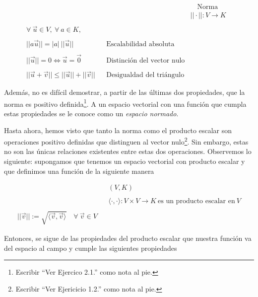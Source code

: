 \documentclass[12pt,dvipsnames]{article}
\numberwithin{equation}{section}
\begin{document}
\begin{align*}
     & & &\quad \text{Norma}& \\
     & & &||\cdot||:V\to K& \\
     \\
     \forall \ \vec{u}\in V, \ \forall \ a\in K, \\
     \\
     ||a\vec{u}|| = |a| \ ||\vec{u}|| & &\text{Escalabilidad absoluta}\\
     \\
     ||\vec{u}|| = 0 \iff \vec{u} = \vec{0} & &\text{Distinción del vector nulo}\\
     \\
     ||\vec{u}+\vec{v}|| \le ||\vec{u}|| + ||\vec{v}|| & &\text{Desigualdad del triángulo}
\end{align*}

Además, no es difícil demostrar, a partir de las últimas dos propiedades, que la norma es positivo definida\footnote{Escribir ``Ver Ejercico 2.1.'' como nota al pie.}. A un espacio vectorial con una función que cumpla estas propiedades se le conoce como un \emph{espacio normado}.

Hasta ahora, hemos visto que tanto la norma como el producto escalar son operaciones positivo definidas que distinguen al vector nulo\footnote{Escribir ``Ver Ejericicio 1.2.'' como nota al pie.}. Sin embargo, estas no son las únicas relaciones existentes entre estas dos operaciones. Observemos lo siguiente: supongamos que tenemos un espacio vectorial con producto escalar y que definimos una función de la siguiente manera

\begin{align*}
    & &(V,K) \\
    \\
    & &\langle \cdot , \cdot \rangle : V\times V\to K \ \text{es un producto escalar en} \ V\\
    \\
    ||\vec{v}||:=\sqrt{\langle \vec{v} , \vec{v} \rangle} \quad \forall \ \vec{v}\in V
\end{align*}

Entonces, se sigue de las propiedades del producto escalar que nuestra función va del espacio al campo y cumple las siguientes propiedades
\end{document}
